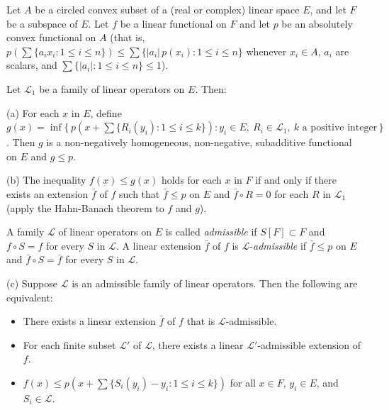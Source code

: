Let $A$ be a circled convex subset of a (real or complex) linear space $E$, and let $F$ be a subspace of $E$. Let $f$ be a linear functional on $F$ and let $p$ be an absolutely convex functional on $A$ (that is, $p\!\left(\sum \{a_i x_i : 1 \leq i \leq n\}\right) \leq \sum \{|a_i|\, p(x_i) : 1 \leq i \leq n\}$ whenever $x_i \in A$, $a_i$ are scalars, and $\sum \{|a_i| : 1 \leq i \leq n\} \leq 1$).

Let $\mathcal{L}_1$ be a family of linear operators on $E$. Then:

(a) For each $x$ in $E$, define $g(x) = \inf \{\, p(x + \sum \{ R_i(y_i) : 1 \leq i \leq k \}) : y_i \in E,\ R_i \in \mathcal{L}_1,\ k \text{ a positive integer} \,\}$. Then $g$ is a non-negatively homogeneous, non-negative, subadditive functional on $E$ and $g \leq p$.

(b) The inequality $f(x) \leq g(x)$ holds for each $x$ in $F$ if and only if there exists an extension $\bar{f}$ of $f$ such that $\bar{f} \leq p$ on $E$ and $\bar{f} \circ R = 0$ for each $R$ in $\mathcal{L}_1$ (apply the Hahn-Banach theorem to $f$ and $g$).

A family $\mathcal{L}$ of linear operators on $E$ is called \emph{admissible} if $S[F] \subset F$ and $f \circ S = f$ for every $S$ in $\mathcal{L}$. A linear extension $\bar{f}$ of $f$ is $\mathcal{L}$-\emph{admissible} if $\bar{f} \leq p$ on $E$ and $\bar{f} \circ S = \bar{f}$ for every $S$ in $\mathcal{L}$.

(c) Suppose $\mathcal{L}$ is an admissible family of linear operators. Then the following are equivalent:
\begin{itemize}
\item[(i)] There exists a linear extension $\bar{f}$ of $f$ that is $\mathcal{L}$-admissible.
\item[(ii)] For each finite subset $\mathcal{L}'$ of $\mathcal{L}$, there exists a linear $\mathcal{L}'$-admissible extension of $f$.
\item[(iii)] $f(x) \leq p(x + \sum \{ S_i(y_i) - y_i : 1 \leq i \leq k \})$ for all $x \in F$, $y_i \in E$, and $S_i \in \mathcal{L}$.
\end{itemize}
